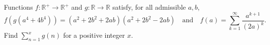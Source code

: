 Functions $f:\mathbb R^+\to\mathbb R^+$ and $g:\mathbb R\to\mathbb R$ satisfy, for all admissible $a,b$,
\[f\left(g\left(a^4+4b^4\right)\right)=\left(a^2+2b^2+2ab\right)\left(a^2+2b^2-2ab\right)\quad\text{and}\quad f(a)=\sum_{k=1}^{\infty}\dfrac{a^{k+1}}{(2a)^k}.\]
Find $\displaystyle\sum_{n=1}^{x}g(n)$ for a positive integer $x$.
